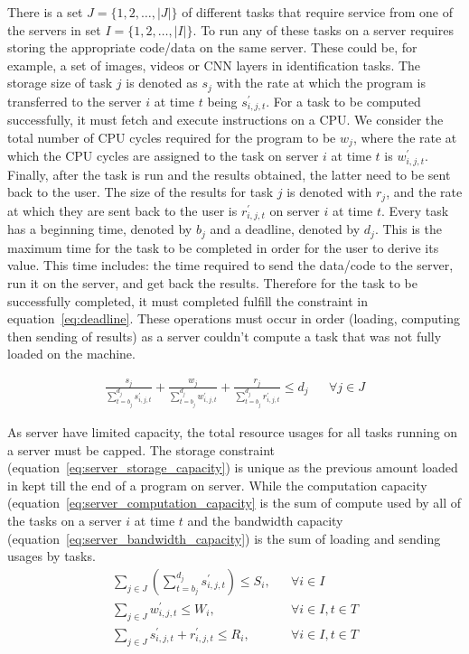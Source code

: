 There is a set $J = \{1,2,\ldots,\left| J \right|\}$ of  different tasks that require service from one of the servers
in set $I = \{1,2,\ldots, \left| I \right|\}$. To run any of these tasks on a server requires storing the appropriate
code/data on the same server. These could be, for example, a set of images, videos or CNN layers in identification
tasks. The storage size of task $j$ is denoted as $s_j$ with the rate at which the program is transferred to the server
$i$ at time $t$ being $s^{'}_{i,j,t}$. For a task to be computed successfully, it must fetch and execute instructions
on a CPU. We consider the total number of CPU cycles required for the program to be $w_j$, where the rate at which the
CPU cycles are assigned to the task on server $i$ at time $t$ is $w^{'}_{i,j,t}$. Finally, after the task is run and
the results obtained, the latter need to be sent back to the user. The size of the results for task $j$ is denoted with
$r_j$, and the rate at which they are sent back to the user is $r^{'}_{i,j,t}$ on server $i$ at time $t$. Every task
has a beginning time, denoted by $b_j$ and a deadline, denoted by $d_j$. This is the maximum time for the task to be
completed in order for the user to derive its value. This time includes: the time required to send the data/code to the
server, run it on the server, and get back the results. Therefore for the task to be successfully completed, it must
completed fulfill the constraint in equation~\eqref{eq:deadline}. These operations must occur in order (loading,
computing then sending of results) as a server couldn't compute a task that was not fully loaded on the machine.

\begin{align}
    \frac{s_j}{\sum^{d_j}_{t=b_j} s^{'}_{i,j,t}} + \frac{w_j}{\sum^{d_j}_{t=b_j} w^{'}_{i,j,t}}  +
    \frac{r_j}{\sum^{d_j}_{t=b_j} r^{'}_{i,j,t}} \leq d_j && \forall{j \in J}  \label{eq:deadline}
\end{align}

As server have limited capacity, the total resource usages for all tasks running on a server must be capped.
The storage constraint (equation~\eqref{eq:server_storage_capacity}) is unique as the previous amount
loaded in kept till the end of a program on server. While the computation capacity
(equation~\eqref{eq:server_computation_capacity} is the sum of compute used by all of the tasks on a server $i$ at time $t$ and the
bandwidth capacity (equation~\eqref{eq:server_bandwidth_capacity}) is the sum of loading and sending usages by tasks.
\begin{align}
    \sum_{j \in J} \left(\sum^{d_j}_{t=b_j} s^{'}_{i,j,t} \right) \leq S_i, && \forall{i \in I} \label{eq:server_storage_capacity} \\
    \sum_{j \in J} w^{'}_{i,j,t} \leq W_i, && \forall{i \in I, t \in T} \label{eq:server_computation_capacity} \\
    \sum_{j \in J} s^{'}_{i,j,t} + r^{'}_{i,j,t} \leq R_i, && \forall{i \in I, t \in T} \label{eq:server_bandwidth_capacity} \\
\end{align}

